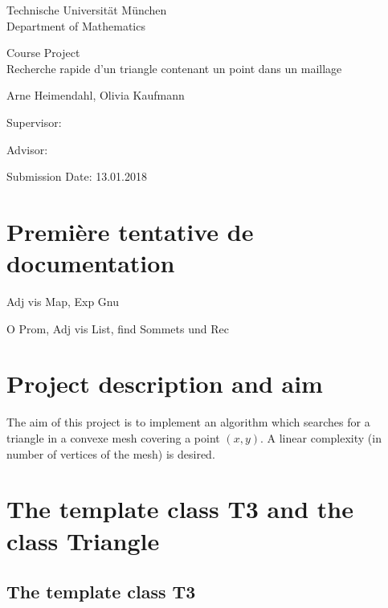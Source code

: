 \documentclass[10pt]{article}
\begin{document}
	
\begin{titlepage}
	\begin{center}
		{\Large
			Technische Universit\"at M\"unchen\\[5mm]
			Department of Mathematics\\[8mm]
		}
		\normalsize
		
		Course Project\\[15mm]
		
		{\Huge
			Recherche rapide d’un triangle contenant un point dans un maillage
		}
		\bigskip
		
		\normalsize
		
		Arne Heimendahl, Olivia Kaufmann
	\end{center}
	\vspace*{75mm}
	
	Supervisor: 
	\medskip
	
	Advisor: 
	\medskip
	
	Submission Date: 13.01.2018 
	
\end{titlepage}

\newpage
\tableofcontents
\newpage

	

\section{Première tentative de documentation}

Adj vis Map, Exp Gnu

O Prom, Adj vis List, find Sommets und Rec

\section{Project description and aim}

The aim of this project is to implement an algorithm which searches for a triangle in a convexe mesh covering a point $(x,y)$. A linear complexity (in number of vertices of the mesh) is desired.

\section{The template class T3 and the class Triangle}

\subsection{The template class T3}
\end{document}
